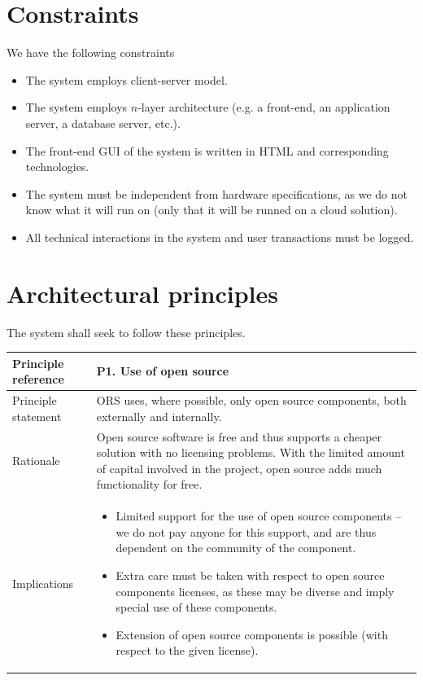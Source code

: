\documentclass[a4paper,11pt]{report}
\begin{document}
\section{Constraints}
\label{sec:constraints}
We have the following constraints
\begin{itemize}
  \item The system employs client-server model.
  \item The system employs $n$-layer architecture (e.g. a front-end, an application server, a database server, etc.).
  \item The front-end GUI of the system is written in HTML and corresponding technologies.
  \item The system must be independent from hardware specifications, as we do not know what it will run on (only that it will be runned on a cloud solution).
  \item All technical interactions in the system and user transactions must be logged.
\end{itemize}


\section{Architectural principles}
\label{sec:arch-princ}
The system shall seek to follow these principles.
\begin{center}
  \begin{tabular}[h!]{| >{\columncolor{gray}}p{} | p{} |}
    \hline
    Principle reference & P1. Use of open source\\
    \hline
    Principle statement & ORS uses, where possible, only open source components, both externally and internally. \\
    \hline
    Rationale & Open source software is free and thus supports a cheaper solution with no licensing problems. With the limited amount of capital involved in the project, open source adds much functionality for free.\\
    \hline
    Implications &
      \begin{itemize}
        \item Limited support for the use of open source components -- we do not pay anyone for this support, and are thus dependent on the community of the component.
        \item Extra care must be taken with respect to open source components licenses, as these may be diverse and imply special use of these components.
        \item Extension of open source components is possible (with respect to the given license).
      \end{itemize}\\
    \hline
  \end{tabular}
\end{center}
\end{document}
